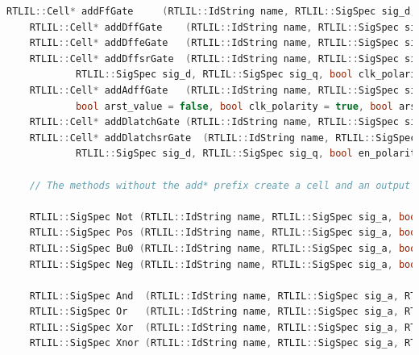 \documentclass[11pt]{report}
\begin{document}
\begin{lstlisting}[language=C++]
	RTLIL::Cell* addFfGate     (RTLIL::IdString name, RTLIL::SigSpec sig_d, RTLIL::SigSpec sig_q, const std::string &src = "");
	RTLIL::Cell* addDffGate    (RTLIL::IdString name, RTLIL::SigSpec sig_clk, RTLIL::SigSpec sig_d, RTLIL::SigSpec sig_q, bool clk_polarity = true, const std::string &src = "");
	RTLIL::Cell* addDffeGate   (RTLIL::IdString name, RTLIL::SigSpec sig_clk, RTLIL::SigSpec sig_en, RTLIL::SigSpec sig_d, RTLIL::SigSpec sig_q, bool clk_polarity = true, bool en_polarity = true, const std::string &src = "");
	RTLIL::Cell* addDffsrGate  (RTLIL::IdString name, RTLIL::SigSpec sig_clk, RTLIL::SigSpec sig_set, RTLIL::SigSpec sig_clr,
			RTLIL::SigSpec sig_d, RTLIL::SigSpec sig_q, bool clk_polarity = true, bool set_polarity = true, bool clr_polarity = true, const std::string &src = "");
	RTLIL::Cell* addAdffGate   (RTLIL::IdString name, RTLIL::SigSpec sig_clk, RTLIL::SigSpec sig_arst, RTLIL::SigSpec sig_d, RTLIL::SigSpec sig_q,
			bool arst_value = false, bool clk_polarity = true, bool arst_polarity = true, const std::string &src = "");
	RTLIL::Cell* addDlatchGate (RTLIL::IdString name, RTLIL::SigSpec sig_en, RTLIL::SigSpec sig_d, RTLIL::SigSpec sig_q, bool en_polarity = true, const std::string &src = "");
	RTLIL::Cell* addDlatchsrGate  (RTLIL::IdString name, RTLIL::SigSpec sig_en, RTLIL::SigSpec sig_set, RTLIL::SigSpec sig_clr,
			RTLIL::SigSpec sig_d, RTLIL::SigSpec sig_q, bool en_polarity = true, bool set_polarity = true, bool clr_polarity = true, const std::string &src = "");

	// The methods without the add* prefix create a cell and an output signal. They return the newly created output signal.

	RTLIL::SigSpec Not (RTLIL::IdString name, RTLIL::SigSpec sig_a, bool is_signed = false, const std::string &src = "");
	RTLIL::SigSpec Pos (RTLIL::IdString name, RTLIL::SigSpec sig_a, bool is_signed = false, const std::string &src = "");
	RTLIL::SigSpec Bu0 (RTLIL::IdString name, RTLIL::SigSpec sig_a, bool is_signed = false, const std::string &src = "");
	RTLIL::SigSpec Neg (RTLIL::IdString name, RTLIL::SigSpec sig_a, bool is_signed = false, const std::string &src = "");

	RTLIL::SigSpec And  (RTLIL::IdString name, RTLIL::SigSpec sig_a, RTLIL::SigSpec sig_b, bool is_signed = false, const std::string &src = "");
	RTLIL::SigSpec Or   (RTLIL::IdString name, RTLIL::SigSpec sig_a, RTLIL::SigSpec sig_b, bool is_signed = false, const std::string &src = "");
	RTLIL::SigSpec Xor  (RTLIL::IdString name, RTLIL::SigSpec sig_a, RTLIL::SigSpec sig_b, bool is_signed = false, const std::string &src = "");
	RTLIL::SigSpec Xnor (RTLIL::IdString name, RTLIL::SigSpec sig_a, RTLIL::SigSpec sig_b, bool is_signed = false, const std::string &src = "");


\end{lstlisting}
\end{document}
